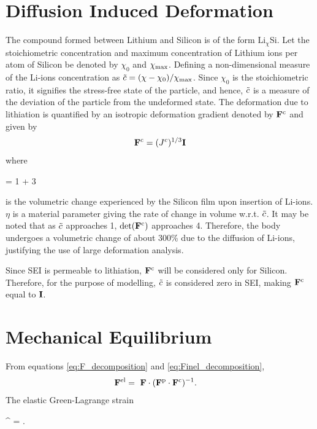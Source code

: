 \section{Diffusion Induced Deformation}
The compound formed between Lithium and Silicon is of the form $\text{Li}_{\chi}$Si. Let the stoichiometric concentration and maximum concentration of Lithium ions per atom of Silicon be denoted by $\chi_0$ and $\chi_{\rm{max}}$. Defining a non-dimensional measure of the Li-ions concentration as $\tilde{c} = (\chi-\chi_{0})/\chi_{{\rm{max}}}$. Since $\chi_{0}$ is the stoichiometric ratio, it signifies the stress-free state of the particle, and hence, $\tilde{c}$ is a measure of the deviation of the particle from the undeformed state. The deformation due to lithiation is quantified by an isotropic deformation gradient denoted by $\mathbf{F}^{\rm{c}}$ and given by
\begin{gather}
\mathbf{F}^{\rm{c}} = ({J^c})^{1/3} \mathbf{I}
\end{gather}
where \begin{nonumbereq}\jc = 1 + 3 \eta \xmax \tc\end{nonumbereq} is the volumetric change experienced by the Silicon film upon insertion of Li-ions. $\eta$ is a material parameter giving the rate of change in volume w.r.t. $\tilde{c}$. It may be noted that as $\tilde{c}$ approaches 1, $\mathrm{det}(\mathbf{F}^{\rm{c}})$ approaches 4. Therefore, the body undergoes a volumetric change of about 300\% due to the diffusion of Li-ions, justifying the use of large deformation analysis.

Since SEI is permeable to lithiation, $\mathbf{F}^{\rm{c}}$ will be considered only for Silicon. Therefore, for the purpose of modelling, $\tilde{c}$ is considered zero in SEI, making $\mathbf{F}^{\rm{c}}$ equal to $\mathbf{I}$.
\section{Mechanical Equilibrium } \label{section:MechEqbm}
From equations \ref{eq:F_decomposition} and \ref{eq:Finel_decomposition},
\begin{align}
\F^{\el} &=  \F \cdot \inv{\F^{\p} \cdot \F^{\c}}. \label{eq:Fel_tensor}
\end{align}
The elastic Green-Lagrange strain
\begin{nonumbereq}
\E^{\el} =  \left[ (\F^\el)^\T \cdot  \F^\el - \I \right].
\end{nonumbereq}

